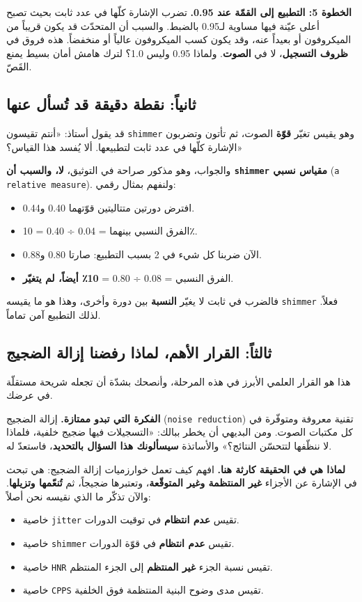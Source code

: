 \documentclass[12pt,a4paper]{report}
\newcommand{\E}[1]{\textenglish{\texttt{#1}}}
\newcommand{\N}[1]{\textenglish{#1}}
\newcommand{\qism}[1]{\subsection*{#1}}
\newcommand{\masdar}[1]{\par\vspace{2pt}{\small\textit{المصدر: #1}}\par}
\begin{document}
\textbf{الخطوة \N{5}: التطبيع إلى القمّة عند \N{0.95}.} تضرب الإشارة كلّها في عدد
ثابت بحيث تصبح أعلى عيّنة فيها مساوية لـ\N{0.95} بالضبط. والسبب أن المتحدّث قد
يكون قريباً من الميكروفون أو بعيداً عنه، وقد يكون كسب الميكروفون عالياً أو
منخفضاً. هذه فروق في \textbf{ظروف التسجيل}، لا في \textbf{الصوت}. ولماذا \N{0.95}
وليس \N{1.0}؟ لترك هامش أمان بسيط يمنع القَصّ.
\masdar{\E{docs/04\_pipeline.md} القسم \N{4.2}}

\qism{ثانياً: نقطة دقيقة قد تُسأل عنها}

قد يقول أستاذ: «أنتم تقيسون \E{shimmer} وهو يقيس تغيّر \textbf{قوّة} الصوت، ثم
تأتون وتضربون الإشارة كلّها في عدد ثابت لتطبيعها. ألا يُفسد هذا القياس؟»

والجواب، وهو مذكور صراحة في التوثيق، \textbf{لا، والسبب أن \E{shimmer} مقياس
نسبي} (\E{a relative measure}). ولنفهم بمثال رقمي:

\begin{itemize}
  \item افترض دورتين متتاليتين قوّتهما \N{0.40} و\N{0.44}.
  \item الفرق النسبي بينهما = \N{0.04} ÷ \N{0.40} = \N{10}٪.
  \item الآن ضربنا كل شيء في \N{2} بسبب التطبيع: صارتا \N{0.80} و\N{0.88}.
  \item الفرق النسبي = \N{0.08} ÷ \N{0.80} = \textbf{\N{10}٪ أيضاً، لم يتغيّر}.
\end{itemize}

فالضرب في ثابت لا يغيّر \textbf{النسبة} بين دورة وأخرى، وهذا هو ما يقيسه
\E{shimmer} فعلاً. لذلك التطبيع آمن تماماً.

\qism{ثالثاً: القرار الأهم، لماذا رفضنا إزالة الضجيج}

هذا هو القرار العلمي الأبرز في هذه المرحلة، وأنصحك بشدّة أن تجعله شريحة مستقلّة
في عرضك.

\textbf{الفكرة التي تبدو ممتازة.} إزالة الضجيج (\E{noise reduction}) تقنية معروفة
ومتوفّرة في كل مكتبات الصوت. ومن البديهي أن يخطر ببالك: «التسجيلات فيها ضجيج
خلفية، فلماذا لا ننظّفها لتتحسّن النتائج؟» والأساتذة \textbf{سيسألونك هذا السؤال
بالتحديد}، فاستعدّ له.

\textbf{لماذا هي في الحقيقة كارثة هنا.} افهم كيف تعمل خوارزميات إزالة الضجيج: هي
تبحث في الإشارة عن الأجزاء \textbf{غير المنتظمة وغير المتوقّعة}، وتعتبرها ضجيجاً،
ثم \textbf{تُنعّمها وتزيلها}. والآن تذكّر ما الذي نقيسه نحن أصلاً:

\begin{itemize}
  \item خاصية \E{jitter} تقيس \textbf{عدم انتظام} في توقيت الدورات.
  \item خاصية \E{shimmer} تقيس \textbf{عدم انتظام} في قوّة الدورات.
  \item خاصية \E{HNR} تقيس نسبة الجزء \textbf{غير المنتظم} إلى الجزء المنتظم.
  \item خاصية \E{CPPS} تقيس مدى وضوح البنية المنتظمة فوق الخلفية.
\end{itemize}
\end{document}
